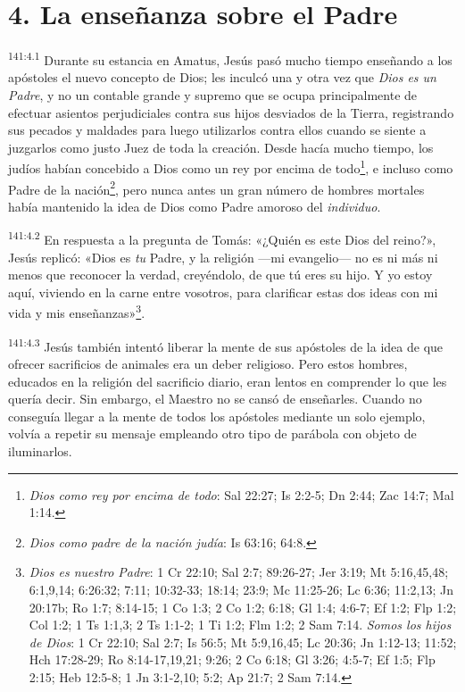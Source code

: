 \section*{4. La enseñanza sobre el Padre}
\par
\textsuperscript{141:4.1} Durante su estancia en Amatus, Jesús pasó mucho tiempo enseñando a los apóstoles el nuevo concepto de Dios; les inculcó una y otra vez que \textit{Dios es un Padre}, y no un contable grande y supremo que se ocupa principalmente de efectuar asientos perjudiciales contra sus hijos desviados de la Tierra, registrando sus pecados y maldades para luego utilizarlos contra ellos cuando se siente a juzgarlos como justo Juez de toda la creación. Desde hacía mucho tiempo, los judíos habían concebido a Dios como un rey por encima de todo\footnote{\textit{Dios como rey por encima de todo}: Sal 22:27; Is 2:2-5; Dn 2:44; Zac 14:7; Mal 1:14.}, e incluso como Padre de la nación\footnote{\textit{Dios como padre de la nación judía}: Is 63:16; 64:8.}, pero nunca antes un gran número de hombres mortales había mantenido la idea de Dios como Padre amoroso del \textit{individuo}.

\par
\textsuperscript{141:4.2} En respuesta a la pregunta de Tomás: «¿Quién es este Dios del reino?», Jesús replicó: «Dios es \textit{tu} Padre, y la religión ---mi evangelio--- no es ni más ni menos que reconocer la verdad, creyéndolo, de que tú eres su hijo. Y yo estoy aquí, viviendo en la carne entre vosotros, para clarificar estas dos ideas con mi vida y mis enseñanzas»\footnote{\textit{Dios es nuestro Padre}: 1 Cr 22:10; Sal 2:7; 89:26-27; Jer 3:19; Mt 5:16,45,48; 6:1,9,14; 6:26:32; 7:11; 10:32-33; 18:14; 23:9; Mc 11:25-26; Lc 6:36; 11:2,13; Jn 20:17b; Ro 1:7; 8:14-15; 1 Co 1:3; 2 Co 1:2; 6:18; Gl 1:4; 4:6-7; Ef 1:2; Flp 1:2; Col 1:2; 1 Ts 1:1,3; 2 Ts 1:1-2; 1 Ti 1:2; Flm 1:2; 2 Sam 7:14. \textit{Somos los hijos de Dios}: 1 Cr 22:10; Sal 2:7; Is 56:5; Mt 5:9,16,45; Lc 20:36; Jn 1:12-13; 11:52; Hch 17:28-29; Ro 8:14-17,19,21; 9:26; 2 Co 6:18; Gl 3:26; 4:5-7; Ef 1:5; Flp 2:15; Heb 12:5-8; 1 Jn 3:1-2,10; 5:2; Ap 21:7; 2 Sam 7:14.}.

\par
\textsuperscript{141:4.3} Jesús también intentó liberar la mente de sus apóstoles de la idea de que ofrecer sacrificios de animales era un deber religioso. Pero estos hombres, educados en la religión del sacrificio diario, eran lentos en comprender lo que les quería decir. Sin embargo, el Maestro no se cansó de enseñarles. Cuando no conseguía llegar a la mente de todos los apóstoles mediante un solo ejemplo, volvía a repetir su mensaje empleando otro tipo de parábola con objeto de iluminarlos.

